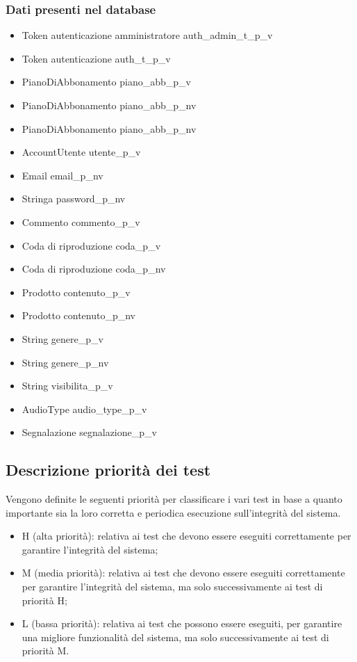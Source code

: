 \subsubsection{Dati presenti nel database}
\begin{itemize}
    \item Token autenticazione amministratore auth\_admin\_t\_p\_v
    \item Token autenticazione auth\_t\_p\_v
    \item PianoDiAbbonamento piano\_abb\_p\_v
    \item PianoDiAbbonamento piano\_abb\_p\_nv
    \item PianoDiAbbonamento piano\_abb\_p\_nv
    \item AccountUtente utente\_p\_v
    \item Email email\_p\_nv
    \item Stringa password\_p\_nv
    \item Commento commento\_p\_v
    \item Coda di riproduzione coda\_p\_v
    \item Coda di riproduzione coda\_p\_nv
    \item Prodotto contenuto\_p\_v
    \item Prodotto contenuto\_p\_nv
    \item String genere\_p\_v
    \item String genere\_p\_nv
    \item String visibilita\_p\_v
    \item AudioType audio\_type\_p\_v
    \item Segnalazione segnalazione\_p\_v

\end{itemize}

\subsection{Descrizione priorità dei test}

Vengono definite le seguenti priorità per classificare i vari test in base a quanto importante sia la
loro corretta e periodica esecuzione sull'integrità del sistema.
\begin{itemize}
    \item H (alta priorità): relativa ai test che devono essere eseguiti correttamente per garantire l'integrità
          del sistema;
    \item M (media priorità): relativa ai test che devono essere eseguiti correttamente per garantire l'integrità
          del sistema, ma solo successivamente ai test di priorità H;
    \item L (bassa priorità): relativa ai test che possono essere eseguiti, per garantire una migliore funzionalità
          del sistema, ma solo successivamente ai test di priorità M.
\end{itemize}


